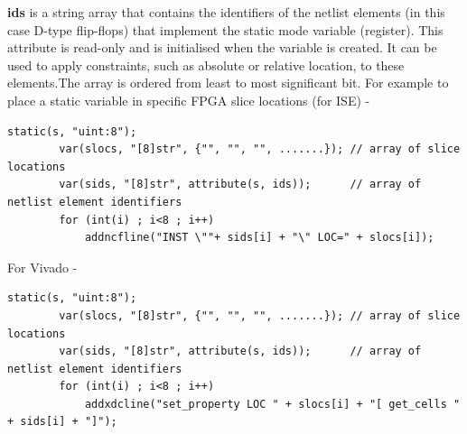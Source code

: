         {\bf ids} is a string array that contains the identifiers of the netlist
        elements (in this case D-type flip-flops) that implement the static mode
        variable (register). This attribute is read-only and is initialised when
        the variable is created. It can be used to apply constraints, such as
        absolute or relative location, to these elements.The array is ordered from
        least to most significant bit. For example to place a static variable in
        specific FPGA slice locations (for ISE) -
        
        \begin{lstlisting}[gobble=8, language=threepl]
        static(s, "uint:8");
        var(slocs, "[8]str", {"", "", "", .......}); // array of slice locations
        var(sids, "[8]str", attribute(s, ids));      // array of netlist element identifiers
        for (int(i) ; i<8 ; i++)
            addncfline("INST \""+ sids[i] + "\" LOC=" + slocs[i]);
        \end{lstlisting}
    
        For Vivado -
        
        \begin{lstlisting}[gobble=8, language=threepl]
        static(s, "uint:8");
        var(slocs, "[8]str", {"", "", "", .......}); // array of slice locations
        var(sids, "[8]str", attribute(s, ids));      // array of netlist element identifiers
        for (int(i) ; i<8 ; i++)
            addxdcline("set_property LOC " + slocs[i] + "[ get_cells " + sids[i] + "]");
        \end{lstlisting}
        
        
        
